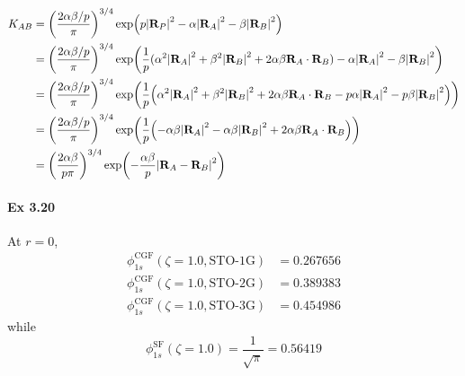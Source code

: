 \documentclass[a4paper]{article}
\newcommand{\ex}[1]{\paragraph{Ex #1}}
\numberwithin{equation}{subsection}
\begin{document}
\begin{align}
K_{AB} &= \qty(\dfrac{2\alpha\beta/p}{\pi})^{3/4} 
\exp(p\abs{\vb{R}_P}^2 - \alpha\abs{\vb{R}_A}^2 -\beta\abs{\vb{R}_B}^2) \notag\\
&= \qty(\dfrac{2\alpha\beta/p}{\pi})^{3/4} 
\exp(\dfrac{1}{p}(
\alpha^2\abs{\vb{R}_A}^2 +\beta^2\abs{\vb{R}_B}^2 + 2\alpha\beta\vb{R}_A\cdot\vb{R}_B )
- \alpha\abs{\vb{R}_A}^2 -\beta\abs{\vb{R}_B}^2) \notag\\
&= \qty(\dfrac{2\alpha\beta/p}{\pi})^{3/4} 
\exp(\dfrac{1}{p} \qty(\alpha^2\abs{\vb{R}_A}^2 +\beta^2\abs{\vb{R}_B}^2 + 2\alpha\beta\vb{R}_A\cdot\vb{R}_B 
- p\alpha\abs{\vb{R}_A}^2 -p\beta\abs{\vb{R}_B}^2)) \notag\\
&= \qty(\dfrac{2\alpha\beta/p}{\pi})^{3/4} 
\exp(\dfrac{1}{p} \qty(-\alpha\beta\abs{\vb{R}_A}^2 -\alpha\beta\abs{\vb{R}_B}^2 + 2\alpha\beta\vb{R}_A\cdot\vb{R}_B )) \notag\\
&= \qty(\dfrac{2\alpha\beta}{p\pi})^{3/4} 
\exp(-\dfrac{\alpha\beta}{p} \abs{\vb{R}_A - \vb{R}_B}^2 ) 
\end{align}

\ex{3.20}
At $ r=0 $,
\begin{align}
\phi_{1s}^{\text{CGF}}(\zeta=1.0, \text{STO-1G}) &= \num{0.267656} \\
\phi_{1s}^{\text{CGF}}(\zeta=1.0, \text{STO-2G}) &= \num{0.389383} \\
\phi_{1s}^{\text{CGF}}(\zeta=1.0, \text{STO-3G}) &= \num{0.454986} 
\end{align}
while
\begin{equation}\label{key}
\phi_{1s}^{\text{SF}}(\zeta=1.0) = \dfrac{1}{\sqrt{\pi}} = \num{0.56419}
\end{equation}
\end{document}
